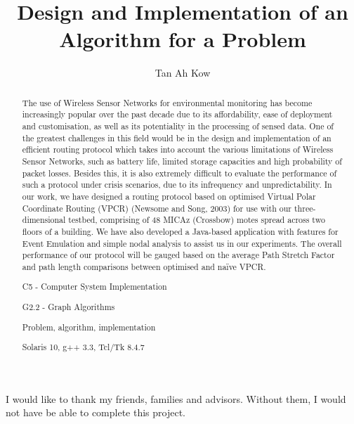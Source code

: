 \documentclass[fyp,12pt]{socreport}
\begin{document}
\title{Design and Implementation of an Algorithm for a Problem}
\author{Tan Ah Kow}
\maketitle
\begin{abstract}
The use of Wireless Sensor Networks for environmental monitoring has become
increasingly popular over the past decade due to its affordability, ease of deployment
and customisation, as well as its potentiality in the processing of sensed data. One of the
greatest challenges in this field would be in the design and implementation of an
efficient routing protocol which takes into account the various limitations of Wireless
Sensor Networks, such as battery life, limited storage capacities and high probability of
packet losses. Besides this, it is also extremely difficult to evaluate the performance of
such a protocol under crisis scenarios, due to its infrequency and unpredictability. In our
work, we have designed a routing protocol based on optimised Virtual Polar Coordinate
Routing (VPCR) (Newsome and Song, 2003) for use with our three-dimensional
testbed, comprising of 48 MICAz (Crossbow) motes spread across two floors of a
building. We have also developed a Java-based application with features for Event
Emulation and simple nodal analysis to assist us in our experiments. The overall
performance of our protocol will be gauged based on the average Path Stretch Factor
and path length comparisons between optimised and naïve VPCR.

\begin{descriptors}
 \item C5 - Computer System Implementation
 \item G2.2 - Graph Algorithms
\end{descriptors}
\begin{keywords}
	Problem, algorithm, implementation
\end{keywords}
\begin{implement}
	Solaris 10, g++ 3.3, Tcl/Tk 8.4.7
\end{implement}
\end{abstract}

\begin{acknowledgement}
   I would like to thank my friends, families and advisors.
   Without them, I would not have be able to complete this project.
\end{acknowledgement}
\end{document}
